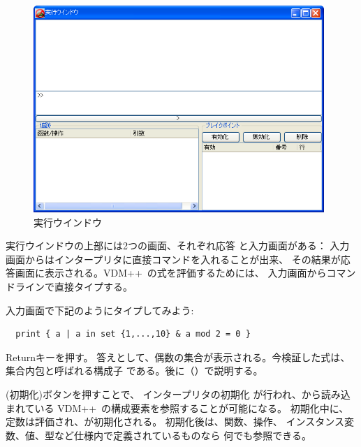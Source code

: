 \documentclass[\pformat,12pt]{jarticle}
\newcommand{\vdmslpp}{VDM++}
\newcommand{\guicmd}[1]{{\gt #1}}
\begin{document}
\begin{figure}[tbh]
\begin{center}
\includegraphics[width=11cm]{interpreterWindow.png}
\caption{実行ウインドウ}
\label{fig:interpwin}
\end{center}
\end{figure}


実行ウインドウの上部には2つの画面、それぞれ\guicmd{応答} と\guicmd{入力}画面がある：
\guicmd{入力}画面からはインタープリタに直接コマンドを入れることが出来、
その結果が\guicmd{応答}画面に表示される。\vdmslpp\ の式を評価するためには、
\guicmd{入力}画面からコマンドラインで直接タイプする。 

入力画面で下記のようにタイプしてみよう:

\begin{verbatim}
  print { a | a in set {1,...,10} & a mod 2 = 0 }
\end{verbatim}

Returnキーを押す。
答えとして、偶数の集合が表示される。今検証した式は、集合内包と呼ばれる構成子
である。後に（）で説明する。

(\guicmd{初期化})ボタンを押すことで、 インタープリタの初期化
が行われ、から読み込まれている
\vdmslpp\ の構成要素を参照することが可能になる。
初期化中に、定数は評価され、が初期化される。
初期化後は、関数、操作、
インスタンス変数、値、型など仕様内で定義されているものなら
何でも参照できる。 
\end{document}

